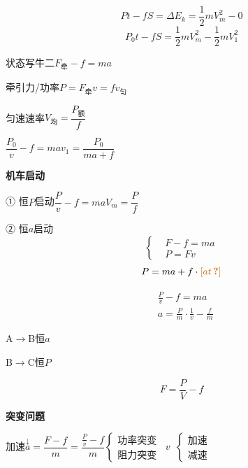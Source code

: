 \[
Pt-fS=\Delta E_k=\frac{1}{2}mV_m^2-0
\]
\[
P_0t-fS=\frac{1}{2}mV_m^2-\frac{1}{2}mV_1^2
\]

状态写牛二\quad $F_{\text{牵}}-f=ma$

牵引力/功率\quad $P=F_{\text{牵}}v=fv_{\text{匀}}$

匀速速率\quad $V_{\text{均}}=\dfrac{P_{\text{额}}}{f}$ %


$\dfrac{P_0}{v}-f=ma$\qquad $v_1=\dfrac{P_0}{ma+f}$

\textbf{机车启动}

① 恒$P$启动\qquad $\dfrac{P}{v}-f=ma$\qquad $V_m=\dfrac{P}{f}$

② 恒$a$启动
\[
\left\{\begin{aligned}
&F-f=ma\\
&P=Fv
\end{aligned}\right.
\]
\[
P=ma+f\cdot\unclear{at}
\]

\begin{align*}
&\frac{P}{v}-f=ma\\
&a=\frac{P}{m}\cdot\frac1v-\frac{f}{m}
\end{align*}

A$\to$B\quad 恒$a$

B$\to$C\quad 恒$P$

\[
F=\frac{P}{V}-f
\]

\textbf{突变问题}

加速\quad $\overset{\downarrow}{a}=\dfrac{F-f}{m}=\dfrac{\frac{P}{v}-f}{m}$\quad $\left\{\begin{array}{l}\text{功率突变}\\ \text{阻力突变}\end{array}\right.$\ $v$\ $\left\{\begin{array}{l}\text{加速}\\ \text{减速}\end{array}\right.$

